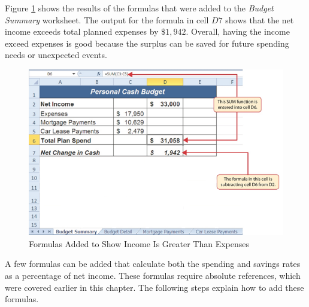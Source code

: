 Figure \ref{02:fig38} shows the results of the formulas that were added to the \textit{Budget Summary} worksheet. The output for the formula in cell $ D7 $ shows that the net income exceeds total planned expenses by $ \$1,942 $. Overall, having the income exceed expenses is good because the surplus can be saved for future spending needs or unexpected events.

\begin{figure}[H]
	\centering
	\includegraphics[width=\maxwidth{.95\linewidth}]{gfx/ch02_fig38}
	\caption{Formulas Added to Show Income Is Greater Than Expenses}
	\label{02:fig38}
\end{figure}

A few formulas can be added that calculate both the spending and savings rates as a percentage of net income. These formulas require absolute references, which were covered earlier in this chapter. The following steps explain how to add these formulas.


